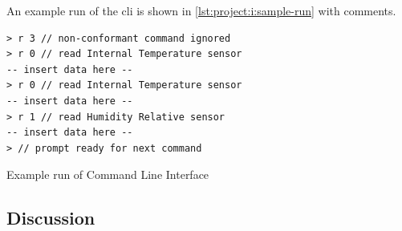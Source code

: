 An example run of the \gls{cli} is shown in \autoref{lst:project:i:sample-run} with comments.

\begin{listing}[H]
  \begin{verbatim}
> r 3 // non-conformant command ignored
> r 0 // read Internal Temperature sensor
-- insert data here --
> r 0 // read Internal Temperature sensor
-- insert data here --
> r 1 // read Humidity Relative sensor
-- insert data here --
> // prompt ready for next command
  \end{verbatim}
  \caption{Example run of Command Line Interface}
  \label{lst:project:i:sample-run}
\end{listing}

\subsection{Discussion}
